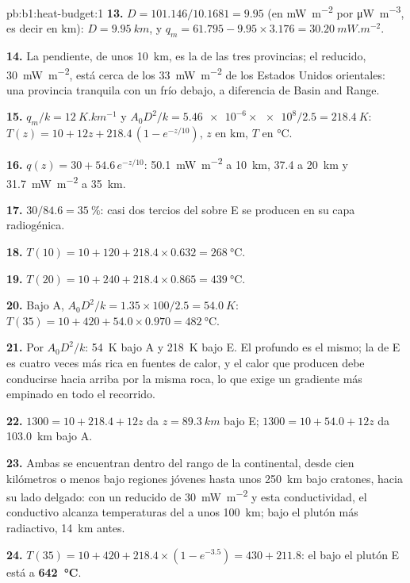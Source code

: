 \begin{solution}{pb:b1:heat-budget:1}
\textbf{13.} $D = 101.146/10.1681 = 9.95$ (en \unit{mW.m^{-2}} por
\unit{\micro W.m^{-3}}, es decir en km): $D = \qty{9.95}{km}$, y $q_m = 61.795 -
9.95\times3.176 = \qty{30.20}{mW.m^{-2}}$.

\textbf{14.} La pendiente, de unos \qty{10}{km}, es la de las tres provincias; el  reducido, \qty{30}{mW.m^{-2}},
está cerca de los \qty{33}{mW.m^{-2}} de los Estados Unidos orientales: una provincia tranquila con un  frío debajo, a
diferencia de Basin and Range.

\textbf{15.} $q_m/k = \qty{12}{K.km^{-1}}$ y $A_0D^2/k = \num{5.46e-6}\times\num{e8}/2.5
= \qty{218.4}{K}$: $T(z) = 10 + 12z + 218.4\,(1 - e^{-z/10})$, $z$ en km, $T$ en
\unit{\degreeCelsius}.

\textbf{16.} $q(z) = 30 + 54.6\,e^{-z/10}$: \qty{50.1}{mW.m^{-2}} a \qty{10}{km},
\num{37.4} a \qty{20}{km} y \qty{31.7}{mW.m^{-2}} a \qty{35}{km}.

\textbf{17.} $30/84.6 = \qty{35}{\percent}$: casi dos tercios del  sobre E se producen en su capa radiogénica.

\textbf{18.} $T(10) = 10 + 120 + 218.4\times0.632 = \qty{268}{\degreeCelsius}$.

\textbf{19.} $T(20) = 10 + 240 + 218.4\times0.865 = \qty{439}{\degreeCelsius}$.

\textbf{20.} Bajo A, $A_0D^2/k = 1.35\times100/2.5 = \qty{54.0}{K}$:
$T(35) = 10 + 420 + 54.0\times0.970 = \qty{482}{\degreeCelsius}$.

\textbf{21.} Por $A_0D^2/k$: \qty{54}{K} bajo A y \qty{218}{K} bajo E. El  profundo es el mismo; la  de E es
cuatro veces más rica en fuentes de calor, y el calor que producen debe conducirse hacia arriba por la misma roca, lo que exige un
gradiente más empinado en todo el recorrido.

\textbf{22.} $1300 = 10 + 218.4 + 12z$ da $z = \qty{89.3}{km}$ bajo E;
$1300 = 10 + 54.0 + 12z$ da \qty{103.0}{km} bajo A.

\textbf{23.} Ambas se encuentran dentro del rango de la  continental, desde cien kilómetros o menos bajo regiones jóvenes
hasta unos \qty{250}{km} bajo cratones, hacia su lado delgado: con un  reducido de \qty{30}{mW.m^{-2}} y esta
conductividad, el  conductivo alcanza temperaturas del  a unos \qty{100}{km}; bajo el plutón más radiactivo,
\qty{14}{km} antes.

\textbf{24.} $T(35) = 10 + 420 + 218.4\times(1 - e^{-3.5}) = 430 + 211.8$: el
 bajo el plutón E está a
\textbf{\qty[text-series-to-math=true]{642}{\degreeCelsius}}.
\end{solution}
